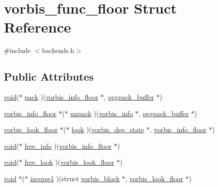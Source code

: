 \hypertarget{structvorbis__func__floor}{}\section{vorbis\+\_\+func\+\_\+floor Struct Reference}
\label{structvorbis__func__floor}


{\ttfamily \#include $<$backends.\+h$>$}

\subsection*{Public Attributes}
\begin{DoxyCompactItemize}
\item 
\hyperlink{sound_8c_ae35f5844602719cf66324f4de2a658b3}{void}($\ast$ \hyperlink{structvorbis__func__floor_a5ed136bf40cd5e778b3292406a455c03}{pack} )(\hyperlink{codec__internal_8h_a8b87cd2e3f6cc302c907d0f741db62fd}{vorbis\+\_\+info\+\_\+floor} $\ast$, \hyperlink{structoggpack__buffer}{oggpack\+\_\+buffer} $\ast$)
\item 
\hyperlink{codec__internal_8h_a8b87cd2e3f6cc302c907d0f741db62fd}{vorbis\+\_\+info\+\_\+floor} $\ast$($\ast$ \hyperlink{structvorbis__func__floor_aecae65a77c093aa23b68da46b046d4b1}{unpack} )(\hyperlink{structvorbis__info}{vorbis\+\_\+info} $\ast$, \hyperlink{structoggpack__buffer}{oggpack\+\_\+buffer} $\ast$)
\item 
\hyperlink{codec__internal_8h_af4cb27874fc2abb2b43a025d7a3c900a}{vorbis\+\_\+look\+\_\+floor} $\ast$($\ast$ \hyperlink{structvorbis__func__floor_a2636469b885c836e2f18fd250638e1d7}{look} )(\hyperlink{structvorbis__dsp__state}{vorbis\+\_\+dsp\+\_\+state} $\ast$, \hyperlink{codec__internal_8h_a8b87cd2e3f6cc302c907d0f741db62fd}{vorbis\+\_\+info\+\_\+floor} $\ast$)
\item 
\hyperlink{sound_8c_ae35f5844602719cf66324f4de2a658b3}{void}($\ast$ \hyperlink{structvorbis__func__floor_acca582708a740c0506abbdb3e7620efe}{free\+\_\+info} )(\hyperlink{codec__internal_8h_a8b87cd2e3f6cc302c907d0f741db62fd}{vorbis\+\_\+info\+\_\+floor} $\ast$)
\item 
\hyperlink{sound_8c_ae35f5844602719cf66324f4de2a658b3}{void}($\ast$ \hyperlink{structvorbis__func__floor_abfd539a69106124b020eeb839337dd13}{free\+\_\+look} )(\hyperlink{codec__internal_8h_af4cb27874fc2abb2b43a025d7a3c900a}{vorbis\+\_\+look\+\_\+floor} $\ast$)
\item 
\hyperlink{sound_8c_ae35f5844602719cf66324f4de2a658b3}{void} $\ast$($\ast$ \hyperlink{structvorbis__func__floor_a2c928191b9252196325df911d54098d5}{inverse1} )(struct \hyperlink{structvorbis__block}{vorbis\+\_\+block} $\ast$, \hyperlink{codec__internal_8h_af4cb27874fc2abb2b43a025d7a3c900a}{vorbis\+\_\+look\+\_\+floor} $\ast$)

\end{DoxyCompactItemize}

